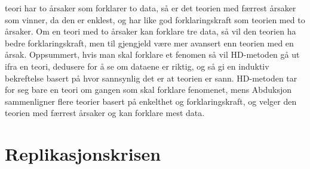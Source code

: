 \documentclass[
]{book}
\begin{document}
teori har to årsaker som forklarer to data, så er det teorien med færrest årsaker som vinner, da den er enklest, og har like god forklaringskraft som teorien med to årsaker. Om en teori med to årsaker kan forklare tre data, så vil den teorien ha bedre forklaringskraft, men til gjengjeld være mer avansert enn teorien med en årsak. Oppsummert, hvis man skal forklare et fenomen så vil HD-metoden gå ut ifra en teori, dedusere for å se om dataene er riktig, og så gi en induktiv bekreftelse basert på hvor sannsynlig det er at teorien er sann. HD-metoden tar for seg bare en teori om gangen som skal forklare fenomenet, mens Abduksjon sammenligner flere teorier basert på enkelthet og forklaringskraft, og velger den teorien med færrest årsaker og kan forklare mest data.

\hypertarget{replikasjonskrisen}{%
\section{Replikasjonskrisen}\label{replikasjonskrisen}}
\end{document}

